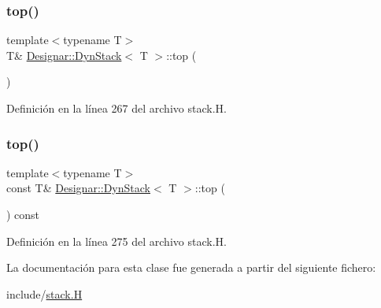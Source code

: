 \subsubsection{\texorpdfstring{top()}{top()}\hspace{0.1cm}{\footnotesize\ttfamily [1/2]}}
{\footnotesize\ttfamily template$<$typename T$>$ \\
T\& \hyperlink{class_designar_1_1_dyn_stack}{Designar\+::\+Dyn\+Stack}$<$ T $>$\+::top (\begin{DoxyParamCaption}{ }\end{DoxyParamCaption})\hspace{0.3cm}{\ttfamily [inline]}}



Definición en la línea 267 del archivo stack.\+H.

\mbox{\label{class_designar_1_1_dyn_stack_a497eb06d2cb8280d031586a913b1317c}} 
\subsubsection{\texorpdfstring{top()}{top()}\hspace{0.1cm}{\footnotesize\ttfamily [2/2]}}
{\footnotesize\ttfamily template$<$typename T$>$ \\
const T\& \hyperlink{class_designar_1_1_dyn_stack}{Designar\+::\+Dyn\+Stack}$<$ T $>$\+::top (\begin{DoxyParamCaption}{ }\end{DoxyParamCaption}) const\hspace{0.3cm}{\ttfamily [inline]}}



Definición en la línea 275 del archivo stack.\+H.



La documentación para esta clase fue generada a partir del siguiente fichero\+:\begin{DoxyCompactItemize}
\item 
include/\hyperlink{stack_8_h}{stack.\+H}\end{DoxyCompactItemize}
